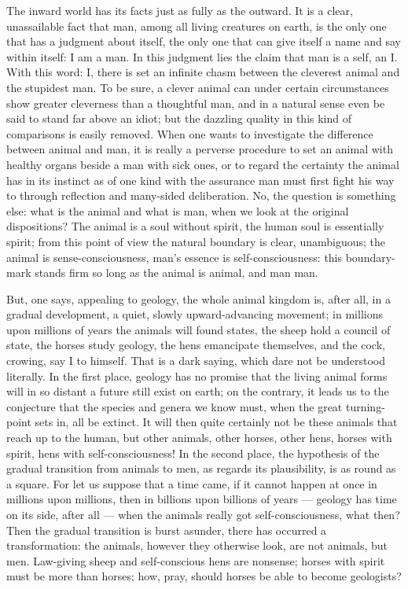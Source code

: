 \documentclass[12pt,a4paper,openany]{book}
\newcommand{\opage}[1]{\marginnote{\footnotesize\textit{[#1]}}}
\begin{document}
The inward world has its facts just
\setcounter{footnote}{0}%
\opage{492}as fully as the outward. It is a clear, unassailable
fact that man, among all living creatures
on earth, is the only one that has a judgment about
itself, the only one that can give itself a name and say within
itself: I am a man. In this judgment lies the claim that
man is a self, an I. With this word: I, there
is set an infinite chasm between the cleverest animal and
the stupidest man. To be sure, a clever animal can under
certain circumstances show greater cleverness than a thoughtful
man, and in a natural sense even be said to
stand far above an idiot; but the dazzling quality in this kind of
comparisons is easily removed. When one wants to investigate
the difference between animal and man, it is really
a perverse procedure to set an animal
with healthy organs beside a man with sick ones,
or to regard the certainty the animal has in its instinct
as of one kind with the assurance man must first
fight his way to through reflection and many-sided deliberation.
No, the question is something else: what is the animal
and what is man, when we look at the original
dispositions? The animal is a soul without spirit, the human soul
is essentially spirit; from this point of view the natural boundary is
clear, unambiguous; the animal is sense-consciousness, man's
essence is self-consciousness: this boundary-mark stands firm
so long as the animal is animal, and man man.

But, one says, appealing to geology, the whole
animal kingdom is, after all, in a gradual development, a quiet,
slowly upward-advancing movement; in millions upon millions
of years the animals will found states, the sheep hold
a council of state, the horses study geology, the hens emancipate
themselves, and the cock, crowing, say I to himself. That is a
\setcounter{footnote}{0}%
\opage{493}dark saying, which dare not be understood literally. In the first
place, geology has no promise that the living
animal forms will in so distant a future still
exist on earth; on the contrary, it leads us to the conjecture
that the species and genera we know must, when
the great turning-point sets in, all be extinct.
It will then quite certainly not be these animals that reach up to the
human, but other animals, other horses, other hens,
horses with spirit, hens with self-consciousness! In the second
place, the hypothesis of the gradual transition from animals
to men, as regards its plausibility, is as round as
a square. For let us suppose that a time came, if
it cannot happen at once in millions upon millions,
then in billions upon billions of years --- geology has
time on its side, after all --- when the animals really got self-consciousness,
what then? Then the gradual transition is burst asunder, there
has occurred a transformation: the animals, however they otherwise
look, are not animals, but men. Law-giving sheep
and self-conscious hens are nonsense; horses with spirit must
be more than horses; how, pray, should horses be able to
become geologists?
\end{document}
